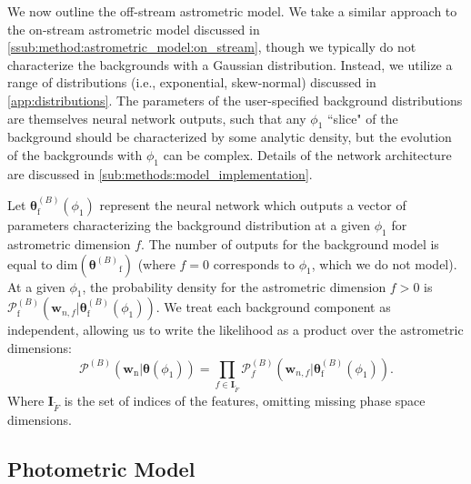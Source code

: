 \documentclass[twocolumn]{aastex631}
\newcommand{\mrm}[1]{\mathrm{#1}}
\newcommand{\mbs}[1]{\boldsymbol{#1}}
\newcommand{\mcal}[1]{\mathcal{#1}}
\newcommand{\pdf}{\mcal{P}}
\newcommand{\nth}[1]{{#1}_{\mrm{n}}}  %
\newcommand{\fth}[1]{{#1}_{\mrm{f}}}  %
\newcommand{\smallcomponent}[2]{#2^{\scriptscriptstyle (#1)}}
\newcommand{\cmp}[2]{\smallcomponent{#1}{#2}}
\newcommand{\Bcmp}[1]{\cmp{B}{#1}}
\begin{document}
            We now outline the off-stream astrometric model. We take a similar
            approach to the on-stream astrometric model discussed in
            \autoref{ssub:method:astrometric_model:on_stream}, though we
            typically do not characterize the backgrounds with a Gaussian
            distribution. Instead, we utilize a range of distributions (i.e.,
            exponential, skew-normal) discussed in \autoref{app:distributions}.
            The parameters of the user-specified background distributions are
            themselves neural network outputs, such that any $\phi_1$ ``slice"
            of the background should be characterized by some analytic density,
            but the evolution of the backgrounds with $\phi_1$ can be complex.
            Details of the network architecture are discussed in
            \autoref{sub:methods:model_implementation}.
    
            Let $\Bcmp{\fth{\mbs{\theta}}}(\phi_1)$ represent the neural network
            which outputs a vector of parameters characterizing the background
            distribution at a given $\phi_1$ for astrometric dimension $f$. The
            number of outputs for the background model is equal to
            $\mathrm{dim}\left(\fth{\Bcmp{\mbs{\theta}}}\right)$ (where $f=0$
            corresponds to $\phi_1$, which we do not model). At a given
            $\phi_1$, the probability density for the astrometric dimension
            $f>0$ is $\Bcmp{\fth{\pdf}}\left(\mbs{w}_{n,f} |
            \Bcmp{\fth{\mbs{\theta}}}(\phi_1) \right)$. We treat each background
            component as independent, allowing us to write the likelihood as a
            product over the astrometric dimensions:
            \begin{equation} \label{eq:astrometric_model_off_stream_probability}
                \pdf^{(B)}\left(\nth{\mbs{w}} | \mbs{\theta}(\phi_1) \right) = \prod_{f\in \mbs{I}_{\tilde{F}}} \pdf_f^{(B)}\left(\mbs{w}_{n,f} | \Bcmp{\fth{\mbs{\theta}}}(\phi_1) \right).
            \end{equation}
            Where $\mbs{I}_{\tilde{F}}$ is the set of indices of the features,
            omitting missing phase space dimensions.
        


    \subsection{Photometric Model} \label{sub:method:photometric_model}
\end{document}

